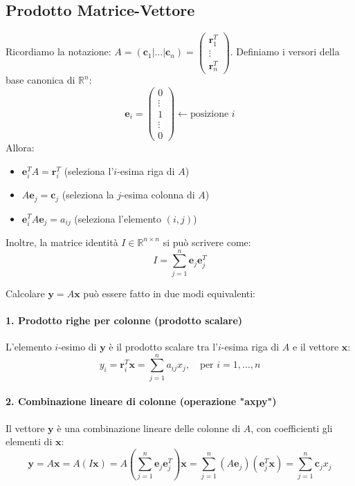 \subsection{Prodotto Matrice-Vettore}
Ricordiamo la notazione: $A = (\mathbf{c}_1 | \dots | \mathbf{c}_n) = \begin{pmatrix} \mathbf{r}_1^T \\ \vdots \\ \mathbf{r}_n^T \end{pmatrix}$.
Definiamo i versori della base canonica di $\mathbb{R}^n$:
$$ \mathbf{e}_i = \begin{pmatrix} 0 \\ \vdots \\ 1 \\ \vdots \\ 0 \end{pmatrix} \leftarrow \text{posizione } i $$
Allora:
\begin{itemize}
    \item $\mathbf{e}_i^T A = \mathbf{r}_i^T$ (seleziona l'$i$-esima riga di $A$)
    \item $A \mathbf{e}_j = \mathbf{c}_j$ (seleziona la $j$-esima colonna di $A$)
    \item $\mathbf{e}_i^T A \mathbf{e}_j = a_{ij}$ (seleziona l'elemento $(i,j)$)
\end{itemize}
Inoltre, la matrice identità $I \in \mathbb{R}^{n \times n}$ si può scrivere come:
$$ I = \sum_{j=1}^n \mathbf{e}_j \mathbf{e}_j^T $$

Calcolare $\mathbf{y} = A\mathbf{x}$ può essere fatto in due modi equivalenti:

\paragraph{1. Prodotto righe per colonne (prodotto scalare)}
L'elemento $i$-esimo di $\mathbf{y}$ è il prodotto scalare tra l'$i$-esima riga di $A$ e il vettore $\mathbf{x}$:
\begin{equation}
    y_i = \mathbf{r}_i^T \mathbf{x} = \sum_{j=1}^n a_{ij} x_j, \quad \text{per } i=1, \dots, n
\end{equation}

\paragraph{2. Combinazione lineare di colonne (operazione "axpy")}
Il vettore $\mathbf{y}$ è una combinazione lineare delle colonne di $A$, con coefficienti gli elementi di $\mathbf{x}$:
\begin{equation}
    \mathbf{y} = A \mathbf{x} = A (I \mathbf{x}) = A \left(\sum_{j=1}^n \mathbf{e}_j \mathbf{e}_j^T\right) \mathbf{x} = \sum_{j=1}^n (A \mathbf{e}_j) (\mathbf{e}_j^T \mathbf{x}) = \sum_{j=1}^n \mathbf{c}_j x_j
\end{equation}

